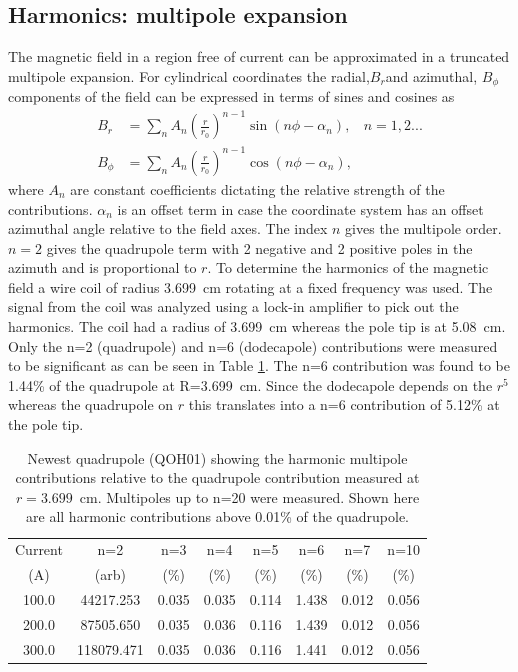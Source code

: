 \documentclass[12pt]{article}
\begin{document}
\subsection{Harmonics: multipole expansion}
The magnetic field in a region free of current can be approximated in a truncated multipole expansion. For cylindrical coordinates the radial,$B_r$and azimuthal, $B_{\phi}$ components of the field can be expressed in terms of sines and cosines as
\begin{align*}
B_r&=\sum_nA_n\left(\frac{r}{r_0}\right)^{n-1}\sin\left(n\phi-\alpha_n\right), ~~~~n=1,2... \\
B_{\phi}&=\sum_nA_n\left(\frac{r}{r_0}\right)^{n-1}\cos\left(n\phi-\alpha_n\right),
\end{align*}
where $A_n$ are constant coefficients dictating the relative strength of the contributions. $\alpha_n$ is an offset term in case the coordinate system has an offset azimuthal angle relative to the field axes. The index $n$ gives the multipole order. $n=2$ gives the quadrupole term with 2 negative and 2 positive poles in the azimuth and is proportional to $r$. To determine the harmonics of the magnetic field a wire coil of radius 3.699~cm rotating at a fixed frequency was used. The signal from the coil was analyzed using a lock-in amplifier to pick out the harmonics. The coil had a radius of 3.699~cm whereas the pole tip is at 5.08~cm. 
Only the n=2 (quadrupole) and n=6 (dodecapole) contributions were measured to be significant as can be seen in Table \ref{tab:q1_harmonics}. The n=6 contribution was found to be 1.44\% of the quadrupole at R=3.699~cm. Since the dodecapole depends on the $r^5$ whereas the quadrupole on $r$ this translates into a n=6 contribution of 5.12\% at the pole tip. 
\begin{table}[ht]
\begin{center}
\caption{\label{tab:q1_harmonics}Newest quadrupole (QOH01) showing the harmonic multipole contributions relative to the quadrupole contribution measured at $r=3.699$~cm. Multipoles up to n=20 were measured. Shown here are all harmonic contributions above 0.01\% of the quadrupole.}
\begin{tabular}{|c|c|c|c|c|c|c|c|}\hline
Current & n=2           &n=3 & n=4 & n=5 & n=6    & n=7  & n=10\\
(A)        & (arb)          &(\%) & (\%)& (\%) & (\%)   & (\%)  & (\%) \\\hline
100.0    &44217.253 &0.035&0.035&0.114&1.438&0.012&0.056\\\hline
200.0    &87505.650 &0.035&0.036&0.116&1.439&0.012&0.056\\\hline
300.0    &118079.471&0.035&0.036&0.116&1.441&0.012&0.056\\\hline
\end{tabular}
\end{center}
\end{table}
\end{document}
